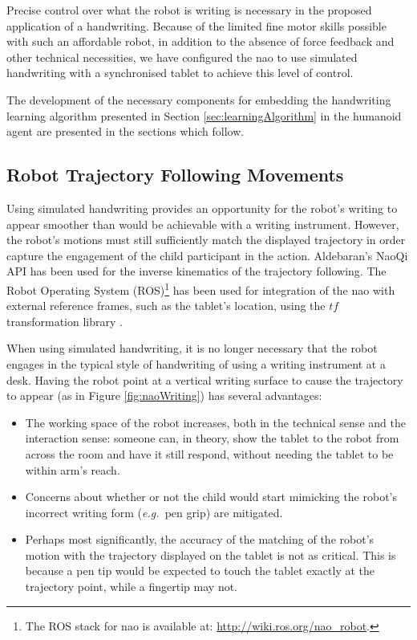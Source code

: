 \documentclass{sig-alternate}
\newcommand{\eg}{{\textit{e.g.~}}}
\begin{document}
Precise control over what the robot is writing is necessary in the
proposed application of a handwriting. Because
of the limited fine motor skills possible with such an affordable robot, in
addition to the absence of force feedback and other technical necessities, we
have configured the {\sc nao} to use simulated handwriting with a synchronised tablet
to achieve this level of control. 

The development of the necessary components for embedding the handwriting learning
algorithm presented in Section \ref{sec:learningAlgorithm} in the humanoid agent
are presented in the sections which follow.

\subsection{Robot Trajectory Following Movements}

Using simulated handwriting provides an opportunity for the robot's writing to
appear smoother than would be achievable with a writing instrument. However, the
robot's motions must still sufficiently match the displayed trajectory in order
capture the engagement of the child participant in the action. Aldebaran's NaoQi API
has been used for the inverse kinematics of the trajectory following. The Robot
Operating System (ROS)\footnote{The ROS stack for {\sc nao} is available at:
\url{http://wiki.ros.org/nao_robot}.} has been used for integration of the {\sc nao}
with external reference frames, such as the tablet's location, 
using the $tf$ transformation library \cite{Foote2013}.

When using simulated handwriting, it is no longer necessary that the robot
engages in the typical style of handwriting of using a writing instrument at a desk.
Having the robot point at a vertical writing surface to cause the
trajectory to appear (as in Figure \ref{fig:naoWriting}) has several
advantages:

\begin{itemize}

    \item The working space of the robot increases, both in the technical sense
        and the interaction sense: someone can, in theory, show the tablet to
        the robot from across the room and have it still respond, without
        needing the tablet to be within arm's reach.

    \item Concerns about whether or not the child would start mimicking the
        robot's incorrect writing form (\eg pen grip) are mitigated. 

    \item Perhaps most significantly, the accuracy of the matching of the
        robot's motion with the trajectory displayed on the tablet is not as
        critical. This is because a pen tip would be expected to touch the
        tablet exactly at the trajectory point, while a fingertip may not.

\end{itemize}
\end{document}
